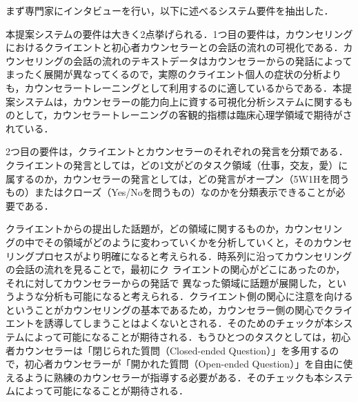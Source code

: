 \documentclass[shuuron]{kuee}
\begin{document}
まず専門家にインタビューを行い，以下に述べるシステム要件を抽出した．




本提案システムの要件は大きく2点挙げられる．1つ目の要件は，カウンセリングにおけるクライエントと初心者カウンセラーとの会話の流れの可視化である．カウンセリングの会話の流れのテキストデータはカウンセラーからの発話によってまったく展開が異なってくるので，実際のクライエント個人の症状の分析よりも，カウンセラートレーニングとして利用するのに適しているからである．本提案システムは，カウンセラーの能力向上に資する可視化分析システムに関するものとして，カウンセラートレーニングの客観的指標は臨床心理学領域で期待がされている．


2つ目の要件は，クライエントとカウンセラーのそれぞれの発言を分類である．クライエントの発言としては，どの1文がどのタスク領域（仕事，交友，愛）に属するのか，カウンセラーの発言としては，どの発言がオープン（5W1Hを問うもの）またはクローズ（Yes/Noを問うもの）なのかを分類表示できることが必要である．

クライエントからの提出した話題が，どの領域に関するものか，カウンセリン
グの中でその領域がどのように変わっていくかを分析していくと，そのカウンセ
リングプロセスがより明確になると考えられる．時系列に沿ってカウンセリングの会話の流れを見ることで，最初にク
ライエントの関心がどこにあったのか，それに対してカウンセラーからの発話で
異なった領域に話題が展開した，というような分析も可能になると考えられる．クライエント側の関心に注意を向けるということがカウンセリングの基本であるため，カウンセラー側の関心でクライエントを誘導してしまうことはよくないとされる．そのためのチェックが本システムによって可能になることが期待される．もうひとつのタスクとしては，初心者カウンセラーは「閉じられた質問（Closed-ended Question）」を多用するので，初心者カウンセラーが「開かれた質問（Open-ended Question）」を自由に使えるように熟練のカウンセラーが指導する必要がある．そのチェックも本システムによって可能になることが期待される．



%
\end{document}
